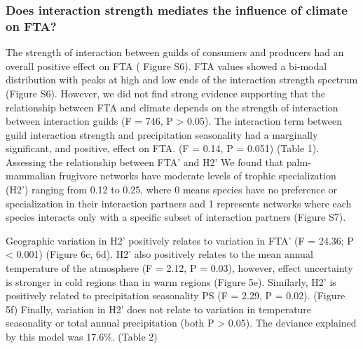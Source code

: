 \documentclass[
]{agujournal2019}
\begin{document}
\subsubsection{Does interaction strength mediates the influence of
climate on
FTA?}\label{does-interaction-strength-mediates-the-influence-of-climate-on-fta}

The strength of interaction between guilds of consumers and producers
had an overall positive effect on FTA ( Figure S6). FTA values showed a
bi-modal distribution with peaks at high and low ends of the interaction
strength spectrum (Figure S6). However, we did not find strong evidence
supporting that the relationship between FTA and climate depends on the
strength of interaction between interaction guilds (F = 746, P
\textgreater{} 0.05). The interaction term between guild interaction
strength and precipitation seasonality had a marginally significant, and
positive, effect on FTA. (F = 0.14, P = 0.051) (Table 1). Assessing the
relationship between FTA' and H2' We found that palm-mammalian frugivore
networks have moderate levels of trophic specialization (H2') ranging
from 0.12 to 0.25, where 0 means species have no preference or
specialization in their interaction partners and 1 represents networks
where each species interacts only with a specific subset of interaction
partners (Figure S7).

Geographic variation in H2' positively relates to variation in FTA' (F =
24.36; P \textless{} 0.001) (Figure 6c, 6d). H2' also positively relates
to the mean annual temperature of the atmosphere (F = 2.12, P = 0.03),
however, effect uncertainty is stronger in cold regions than in warm
regions (Figure 5e). Similarly, H2' is positively related to
precipitation seasonality PS (F = 2.29, P = 0.02). (Figure 5f) Finally,
variation in H2' does not relate to variation in temperature seasonality
or total annual precipitation (both P \textgreater{} 0.05). The deviance
explained by this model was 17.6\%. (Table 2)
\end{document}
